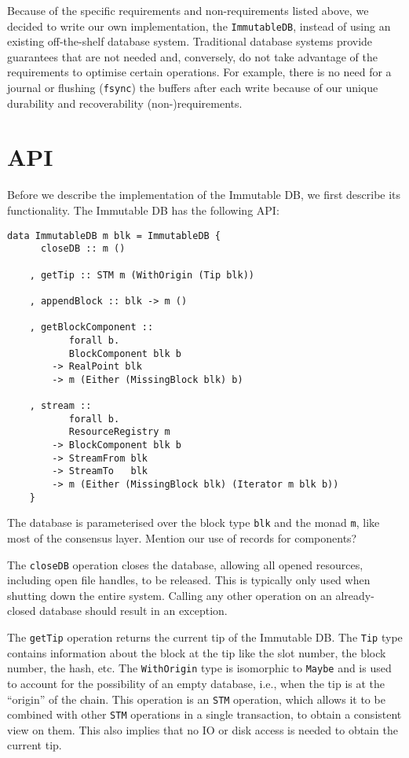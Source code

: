 Because of the specific requirements and non-requirements listed above, we
decided to write our own implementation, the \lstinline!ImmutableDB!, instead of
using an existing off-the-shelf database system. Traditional database systems
provide guarantees that are not needed and, conversely, do not take advantage of
the requirements to optimise certain operations. For example, there is no need
for a journal or flushing (\lstinline!fsync!) the buffers after each write
because of our unique durability and recoverability (non-)requirements.

\section{API}
\label{immutable:api}

Before we describe the implementation of the Immutable DB, we first describe its
functionality. The Immutable DB has the following API:

\begin{lstlisting}
data ImmutableDB m blk = ImmutableDB {
      closeDB :: m ()

    , getTip :: STM m (WithOrigin (Tip blk))

    , appendBlock :: blk -> m ()

    , getBlockComponent ::
           forall b.
           BlockComponent blk b
        -> RealPoint blk
        -> m (Either (MissingBlock blk) b)

    , stream ::
           forall b.
           ResourceRegistry m
        -> BlockComponent blk b
        -> StreamFrom blk
        -> StreamTo   blk
        -> m (Either (MissingBlock blk) (Iterator m blk b))
    }
\end{lstlisting}

The database is parameterised over the block type \lstinline!blk! and the monad
\lstinline!m!, like most of the consensus layer.
 Mention our use of records for components?

The \lstinline!closeDB! operation closes the database, allowing all opened
resources, including open file handles, to be released. This is typically only
used when shutting down the entire system. Calling any other operation on an
already-closed database should result in an exception.

The \lstinline!getTip! operation returns the current tip of the Immutable DB.
The \lstinline!Tip! type contains information about the block at the tip like
the slot number, the block number, the hash, etc. The \lstinline!WithOrigin!
type is isomorphic to \lstinline!Maybe! and is used to account for the
possibility of an empty database, i.e., when the tip is at the ``origin'' of the
chain. This operation is an \lstinline!STM! operation, which allows it to be
combined with other \lstinline!STM! operations in a single transaction, to
obtain a consistent view on them. This also implies that no IO or disk access is
needed to obtain the current tip.

